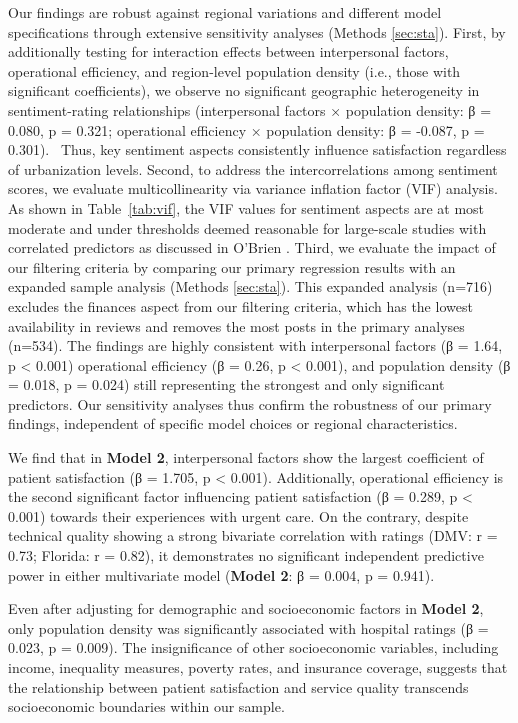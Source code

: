 \documentclass[journal,twoside,web]{ieeecolor}
\begin{document}
Our findings are robust against regional variations and different model specifications through extensive sensitivity analyses (Methods \ref{sec:sta}). First, by additionally testing for interaction effects between interpersonal factors, operational efficiency, and region-level population density (i.e., those with significant coefficients), we observe no significant geographic heterogeneity in sentiment-rating relationships (interpersonal factors × population density: β = 0.080, p = 0.321; operational efficiency × population density: β = -0.087, p = 0.301).  Thus, key sentiment aspects consistently influence satisfaction regardless of urbanization levels. Second, to address the intercorrelations among sentiment scores, we evaluate multicollinearity via variance inflation factor (VIF) analysis. As shown in Table~\ref{tab:vif}, the VIF values for sentiment aspects are at most moderate and under thresholds deemed reasonable for large-scale studies with correlated predictors as discussed in O'Brien \cite{obrien2007caution}. Third, we evaluate the impact of our filtering criteria by comparing our primary regression results with an expanded sample analysis (Methods \ref{sec:sta}). This expanded analysis (n=716) excludes the finances aspect from our filtering criteria, which has the lowest availability in reviews and removes the most posts in the primary analyses (n=534). The findings are highly consistent with interpersonal factors (β = 1.64, p < 0.001) operational efficiency (β = 0.26, p < 0.001), and population density (β = 0.018, p = 0.024) still representing the strongest and only significant predictors. Our sensitivity analyses thus confirm the robustness of our primary findings, independent of specific model choices or regional characteristics.

We find that in \textbf{Model 2}, interpersonal factors show the largest coefficient of patient satisfaction (β = 1.705, p < 0.001). Additionally, operational efficiency is the second significant factor influencing patient satisfaction (β = 0.289, p < 0.001) towards their experiences with urgent care. On the contrary, despite technical quality showing a strong bivariate correlation with ratings (DMV: r = 0.73; Florida: r = 0.82), it demonstrates no significant independent predictive power in either multivariate model (\textbf{Model 2}: β = 0.004, p = 0.941). 

Even after adjusting for demographic and socioeconomic factors in \textbf{Model 2}, only population density was significantly associated with hospital ratings (β = 0.023, p = 0.009). The insignificance of other socioeconomic variables, including income, inequality measures, poverty rates, and insurance coverage, suggests that the relationship between patient satisfaction and service quality transcends socioeconomic boundaries within our sample.
\end{document}
